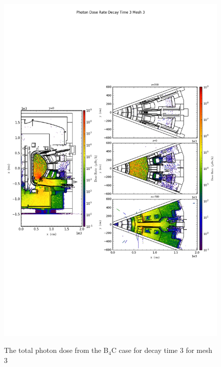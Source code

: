 \begin{figure}[ht!]
\centering
\includegraphics[trim={0cm 9cm 0cm 10cm},clip,scale=0.75]{../plots/final_model_nob4c/Photon_Dose_Rate_Decay_Time_3_Mesh_3.png}
\label{fig:photons_dc3_no4bc_m3_flux}
\caption{The total photon dose from the B$_4$C case for decay time 3 for mesh 3}
\end{figure}
